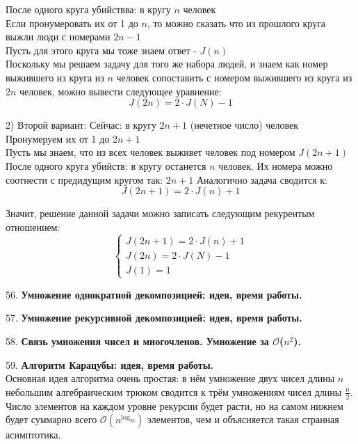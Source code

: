 \documentclass[12pt]{article}
\begin{document}
После одного круга убийствва: в кругу $n$ человек \\
Если пронумеровать их от 1 до $n$, то можно сказать что из прошлого круга выжли люди с номерами $2n - 1$\\
Пусть для этого круга мы тоже знаем ответ - $J(n)$ \\
Поскольку мы решаем задачу для того же набора людей, и знаем как номер выжившего из круга из $n$ человек сопоставить с номером выжившего 
из круга из $2n$ человек, можно вывести следующее уравнение:
$$J(2n)=2\cdot J(N) - 1$$

2) Второй вариант:
Сейчас: в кругу $2n+1$ (нечетное число) человек \\
Пронумеруем их от 1 до $2n+1$ \\
Пусть мы знаем, что из всех человек выживет человек под номером $J(2n+1)$ \\

После одного круга убийств: в кругу останется $n$ человек.
Их номера можно соотнести с предидущим кругом так: $2n+1$
Аналогично задача сводится к:
$$J(2n+1) = 2\cdot J(n) + 1$$

Значит, решение данной задачи можно записать следующим рекурентым отношением:\\
\[
\begin{cases}
J(2n+1) = 2\cdot J(n) + 1
\\
J(2n)=2\cdot J(N) - 1
\\
J(1) = 1
\end{cases}
\]

56. \textbf{Умножение однократной декомпозицией: идея, время работы.}

57. \textbf{Умножение рекурсивной декомпозицией: идея, время работы.}

58. \textbf{Связь умножения чисел и многочленов. Умножение за $\mathcal{O}$($n^2$).}

59. \textbf{Алгоритм Карацубы: идея, время работы.}\\

Основная идея алгоритма очень простая: в нём умножение двух чисел длины $n$ небольшим алгебраическим трюком сводится к трём умножениям чисел длины $\frac{n}{2}$. 
Число элементов на каждом уровне рекурсии будет расти, но на самом нижнем будет суммарно всего $\mathcal{O}(n^{\log_23})$ элементов, чем и объясняется такая странная асимптотика.
\end{document}
